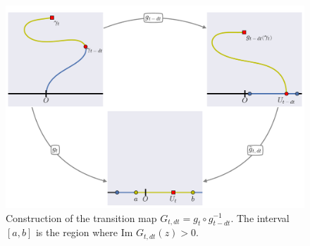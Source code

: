 \begin{figure}
\begin{center}
    \includegraphics[scale=0.4]{chapters/ch7-apdx/figs/proofscheme}
\end{center}
\caption{Construction of the transition map $G_{t,dt}=g_t\circ
    g_{t-dt}^{-1}$. The interval $[a,b]$ is the region where
    $\mbox{Im }G_{t,dt}(z)>0$.}
\label{fig:proofscheme}
\end{figure}
